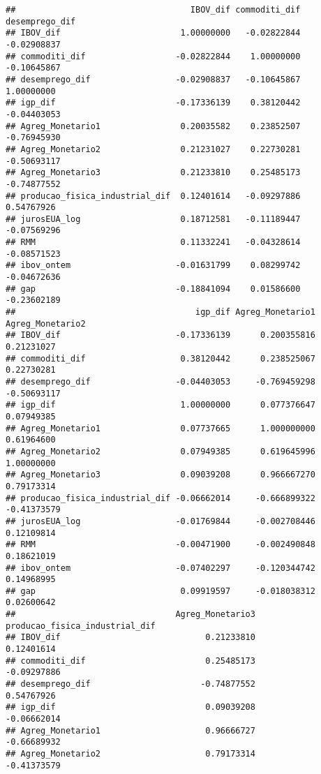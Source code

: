\documentclass[
]{article}
\begin{document}
\begin{verbatim}
##                                   IBOV_dif commoditi_dif desemprego_dif
## IBOV_dif                        1.00000000   -0.02822844    -0.02908837
## commoditi_dif                  -0.02822844    1.00000000    -0.10645867
## desemprego_dif                 -0.02908837   -0.10645867     1.00000000
## igp_dif                        -0.17336139    0.38120442    -0.04403053
## Agreg_Monetario1                0.20035582    0.23852507    -0.76945930
## Agreg_Monetario2                0.21231027    0.22730281    -0.50693117
## Agreg_Monetario3                0.21233810    0.25485173    -0.74877552
## producao_fisica_industrial_dif  0.12401614   -0.09297886     0.54767926
## jurosEUA_log                    0.18712581   -0.11189447    -0.07569296
## RMM                             0.11332241   -0.04328614    -0.08571523
## ibov_ontem                     -0.01631799    0.08299742    -0.04672636
## gap                            -0.18841094    0.01586600    -0.23602189
##                                    igp_dif Agreg_Monetario1 Agreg_Monetario2
## IBOV_dif                       -0.17336139      0.200355816       0.21231027
## commoditi_dif                   0.38120442      0.238525067       0.22730281
## desemprego_dif                 -0.04403053     -0.769459298      -0.50693117
## igp_dif                         1.00000000      0.077376647       0.07949385
## Agreg_Monetario1                0.07737665      1.000000000       0.61964600
## Agreg_Monetario2                0.07949385      0.619645996       1.00000000
## Agreg_Monetario3                0.09039208      0.966667270       0.79173314
## producao_fisica_industrial_dif -0.06662014     -0.666899322      -0.41373579
## jurosEUA_log                   -0.01769844     -0.002708446       0.12109814
## RMM                            -0.00471900     -0.002490848       0.18621019
## ibov_ontem                     -0.07402297     -0.120344742       0.14968995
## gap                             0.09919597     -0.018038312       0.02600642
##                                Agreg_Monetario3 producao_fisica_industrial_dif
## IBOV_dif                             0.21233810                     0.12401614
## commoditi_dif                        0.25485173                    -0.09297886
## desemprego_dif                      -0.74877552                     0.54767926
## igp_dif                              0.09039208                    -0.06662014
## Agreg_Monetario1                     0.96666727                    -0.66689932
## Agreg_Monetario2                     0.79173314                    -0.41373579

\end{verbatim}
\end{document}
